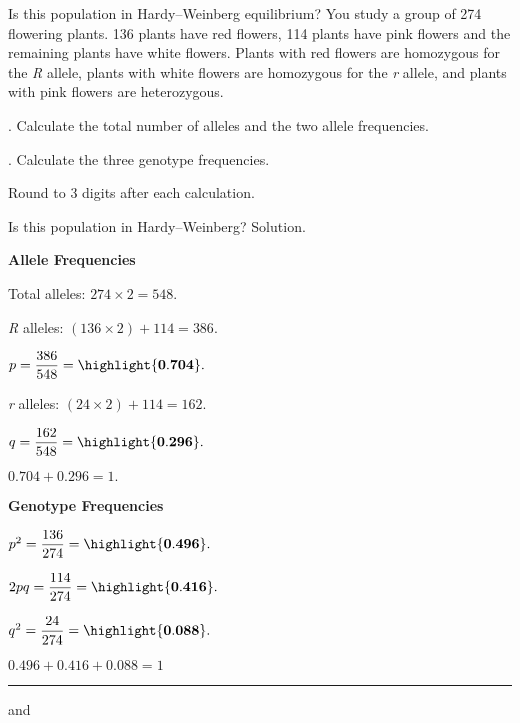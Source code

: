\documentclass[t]{beamer}
\begin{document}
%
\begin{frame}{Is this population in Hardy--Weinberg equilibrium?}
	\hangpara You study a group of 274 flowering plants.  136 plants have red flowers, 114 plants have pink flowers and the remaining plants have white flowers. Plants with red flowers are homozygous for the \emph{R} allele, plants with white flowers are homozygous for the \emph{r} allele, and plants with pink flowers are heterozygous.

	. Calculate the total number of alleles and the two allele frequencies.

	. Calculate the three genotype frequencies.

	\hangpara Round to 3 digits after each calculation.
\end{frame}
%
{
\begin{frame}{Is this population in Hardy--Weinberg? Solution.}
\begin{multicols}{2}

	\hangpara \textbf{Allele Frequencies}
	
	\hangpara Total alleles: $274 \times 2 = 548.$
	
	\hangpara \emph{R} alleles: $(136 \times 2) + 114 = 386.$
	
	\hangpara $p = \dfrac{386}{548} = \highlight{\mathbf{0.704}}.$

	\hangpara \emph{r} alleles: $(24 \times 2) + 114 = 162.$ 

	\hangpara $q = \dfrac{162}{548} = \highlight{\mathbf{0.296}}.$
	
	\hangpara $0.704 + 0.296 = 1.$ \checkmark

\columnbreak

	\hangpara \textbf{Genotype Frequencies}
	
	\hangpara $p^2 = \dfrac{136}{274} = \highlight{\mathbf{0.496}}.$ 

	\hangpara $2pq = \dfrac{114}{274} = \highlight{\mathbf{0.416}}.$

	\hangpara $q^2 = \dfrac{24}{274} = \highlight{\mathbf{0.088}}.$

	\hangpara $0.496 + 0.416 + 0.088 = 1$ \checkmark
	
	\rule{0.4\textwidth}{0.1pt}\vspace{-0.5\baselineskip}
	
	\hangpara {} and
	

\end{multicols}
\end{frame}
}
%
\end{document}
